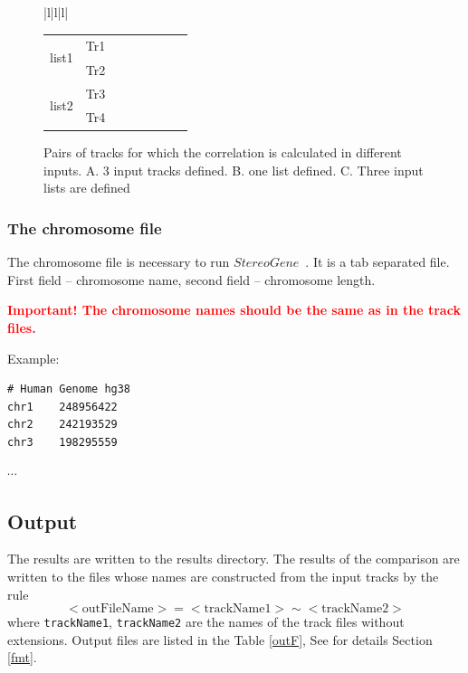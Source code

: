 \documentclass{article}
\newcommand{\tw}{\textwidth}
\newcommand{\red}{\textcolor{red}}
\newcommand{\sg}{$StereoGene$\ }
\begin{document}
\begin{figure}[!h]
\begin{tabular}{|l|l|l|}
\begin{minipage}{0.42\tw}
\begin{tabular}{ll|ll|ll|ll}
\multirow{2}{*}{\begin{sideways} list1 \end{sideways}}
&Tr1&\cellcolor{gray}&\cellcolor{gray}&\cor &\cor & \cor & \cor\\
&Tr2&\cellcolor{gray}&\cellcolor{gray}&\cor &\cor &\cor &\cor\\\hline

\multirow{2}{*}{\begin{sideways} list2 \end{sideways}}
&Tr3&\cellcolor{gray}&\cellcolor{gray}&\cellcolor{gray}&\cellcolor{gray}&\cor &\cor \\
&Tr4&\cellcolor{gray}&\cellcolor{gray}&\cellcolor{gray}&\cellcolor{gray}&\cor &\cor \\
\end{tabular}
\end{minipage}
\end{tabular}
\caption{Pairs of tracks for which the correlation is calculated in different inputs. A. 3 input tracks defined. B. one list defined. C. Three input lists are defined}\label{trackPairs}
\end{figure}

\subsubsection{The chromosome file}
The chromosome file is necessary to run \sg. It is a tab separated file. First field -- chromosome name, second field -- chromosome length. 

\red{\textbf{Important! The chromosome names should be the same as in the track files.}}

Example:

\begin{minipage}{0.3\tw}
\begin{shaded}
\begin{verbatim}
# Human Genome hg38
chr1	248956422
chr2	242193529
chr3	198295559
\end{verbatim}
$\cdots$
\end{shaded}
\end{minipage}



\subsection{Output}
The results are written to the results directory. The results of the comparison are written to the files whose names are constructed from the input tracks by the rule
$$
<\text{outFileName}>=<\text{trackName1}>\sim <\text{trackName2}>
$$
where \texttt{trackName1}, \texttt{trackName2} are the names of the track files without extensions. Output files are listed in the Table \ref{outF}, See for details Section \ref{fmt}.
\end{document}
